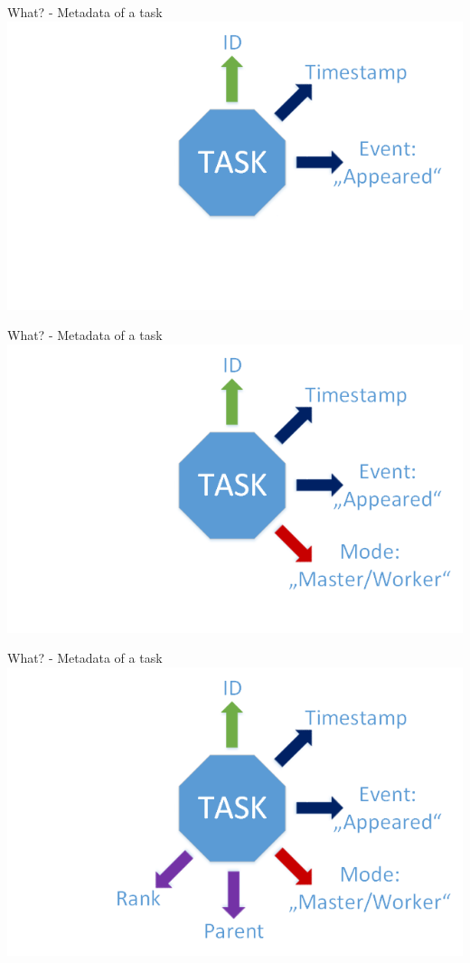 	\begin{frame}{What? - Metadata of a task}
	\includegraphics[width=1.0\textwidth]{images/Task/zeichnungstep3.png}
	\end{frame}
	
	\begin{frame}{What? - Metadata of a task}
	\includegraphics[width=1.0\textwidth]{images/Task/zeichnungstep2.png}
	\end{frame}
	
	\begin{frame}{What? - Metadata of a task}
	\includegraphics[width=1.0\textwidth]{images/Task/zeichnungstep1.png}
	\end{frame}
	

